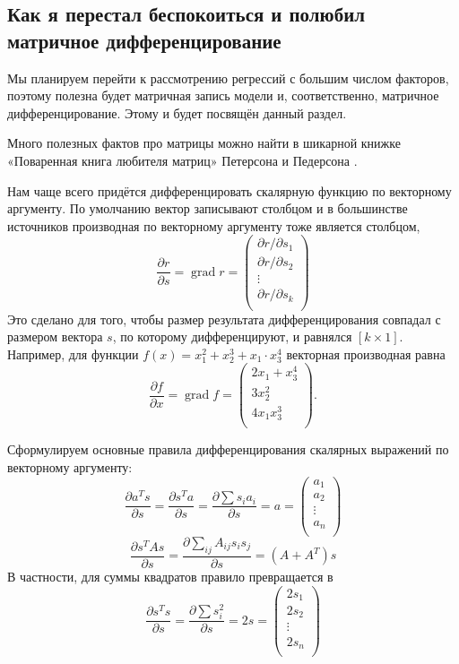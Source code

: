 \documentclass[12pt]{article}
\DeclareMathOperator{\grad}{grad}
\begin{document}
\subsection{Как я перестал беспокоиться и полюбил матричное дифференцирование}

Мы планируем перейти к рассмотрению регрессий с большим числом факторов, поэтому полезна будет матричная запись модели и, соответственно, матричное дифференцирование. 
Этому и будет посвящён данный раздел.

Много полезных фактов про матрицы можно найти в шикарной книжке «Поваренная книга любителя матриц» Петерсона и Педерсона \cite{petersen2012matrix}.


Нам чаще всего придётся дифференцировать скалярную функцию по векторному аргументу. 
По умолчанию вектор записывают столбцом и в большинстве источников производная по векторному аргументу тоже является столбцом,
\[
\frac{\partial r}{\partial s} = \grad r = \begin{pmatrix}
    \partial r/\partial s_1 \\
    \partial r/\partial s_2 \\
    \vdots \\
    \partial r/\partial s_k \\    
\end{pmatrix}
\]
Это сделано для того, чтобы размер результата дифференцирования совпадал с размером вектора $s$, по которому дифференцируют, и равнялся $[k \times 1]$. 
Например, для функции $f(x) = x_1^2 + x_2^3 + x_1 \cdot x_3^4$ векторная производная равна
\[
\frac{\partial f}{\partial x} = \grad f = \begin{pmatrix}
    2x_1 + x_3^4\\
    3x_2^2 \\
    4x_1 x_3^3 \\
\end{pmatrix}.
\]

Сформулируем основные правила дифференцирования скалярных выражений по векторному аргументу:
\[
\frac{\partial a^T s}{\partial s} = \frac{\partial s^T a}{\partial s} = \frac{\partial \sum s_i a_i}{\partial s} = a = \begin{pmatrix}
    a_1 \\
    a_2 \\
    \vdots \\
    a_n \\
\end{pmatrix}
\]
\[
\frac{\partial s^T A s}{\partial s} = \frac{\partial \sum_{ij}A_{ij}s_i s_j}{\partial s} = (A + A^T)s
\]
В частности, для суммы квадратов правило превращается в 
\[
\frac{\partial s^T s}{\partial s} = \frac{\partial \sum s_i^2}{\partial s}  = 2s = \begin{pmatrix}
    2s_1 \\
    2s_2 \\
    \vdots \\
    2s_n \\
\end{pmatrix}
\]
\end{document}
